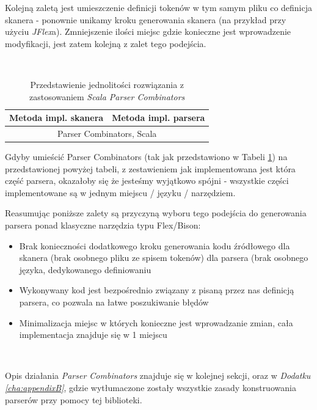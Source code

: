 \documentclass[pdflatex,11pt]{aghdpl}
\begin{document}
Kolejną zaletą jest umieszczenie definicji tokenów w tym samym pliku co definicja skanera - ponownie unikamy kroku generowania 
skanera (na przykład przy użyciu \textit{JFlex}a). Zmniejszenie ilości miejsc gdzie konieczne jest wprowadzenie modyfikacji, jest zatem kolejną z zalet
tego podejścia.

~\\\*

\begin{table}[ch]
  \begin{center}
    \begin{tabular}{| l | l |}
      \hline
      Metoda impl. skanera & Metoda impl. parsera\\
      \hline
      \multicolumn{2}{|c|}{Parser Combinators, Scala} \\
      \hline
    \end{tabular}
    \caption{Przedstawienie jednolitości rozwiązania z zastosowaniem \textit{Scala Parser Combinators}}
  \end{center}
  \label{tab:scala_parsers_table}
\end{table}

Gdyby umieścić Parser Combinators (tak jak przedstawiono w Tabeli \ref{tab:scala_parsers_table}) na przedstawionej powyżej tabeli, z zestawieniem jak implementowana jest która część parsera,
okazałoby się że jesteśmy wyjątkowo spójni - wszystkie części implementowane są w jednym miejscu / języku / narzędziem.

Reasumując poniższe zalety są przyczyną wyboru tego podejścia do generowania parsera ponad klasyczne narzędzia typu Flex/Bison:
\begin{itemize}
 \item Brak konieczności dodatkowego kroku generowania kodu źródłowego
  \subitem dla skanera (brak osobnego pliku ze spisem tokenów)
  \subitem dla parsera (brak osobnego języka, dedykowanego definiowaniu
 \item Wykonywany kod jest bezpośrednio związany z pisaną przez nas definicją parsera, co pozwala na łatwe poszukiwanie błędów
 \item Minimalizacja miejsc w których konieczne jest wprowadzanie zmian, cała implementacja znajduje się w 1 miejscu
\end{itemize}


\begin{verbatim}
 
\end{verbatim}

Opis działania \textit{Parser Combinators} znajduje się w kolejnej sekcji, oraz w \textit{Dodatku \ref{cha:appendixB}}, gdzie wytłumaczone zostały wszystkie zasady
konstruowania parserów przy pomocy tej biblioteki.
\end{document}

